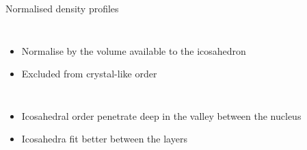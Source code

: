 \begin{frame}{Normalised density profiles}
	\begin{columns}
	\resizebox{\columnwidth}{!}{}
	\begin{itemize}
		\item Normalise by the volume available to the icosahedron
		\item Excluded from crystal-like order
	\end{itemize}
	\end{columns}
	\begin{itemize}
		\item Icosahedral order penetrate deep in the valley between the nucleus
		\item Icosahedra fit better between the layers
	\end{itemize}
\end{frame}